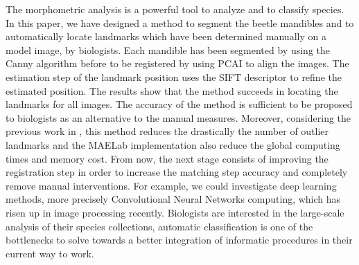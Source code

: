 \documentclass[twoside,twocolumn,10pt]{article}
\begin{document}
The morphometric analysis is a powerful tool to analyze and to
classify species. In this paper, we have designed a method to segment
the beetle mandibles and to automatically locate landmarks which have
been determined manually on a model image, by biologists. Each
mandible has been segmented by using the Canny algorithm before to be
registered by using PCAI to align the images. The estimation step of the
landmark position uses the SIFT descriptor to refine the estimated position.
The results show that the method succeeds in locating the landmarks for all images.
The accuracy of the method is sufficient to be proposed to biologists
as an alternative to the manual measures. Moreover, considering the previous work in
\cite{leestimating}, this method reduces the drastically the number of
outlier landmarks and the MAELab implementation also reduce the global
computing times and memory cost. From now, the next stage consists of
improving the registration step in order to increase the matching step
accuracy and completely remove manual interventions. For example, we
could investigate deep learning methods, more precisely Convolutional
Neural Networks computing,  which has risen up in
image processing recently. Biologists are interested in the large-scale
analysis of their species collections, automatic classification is one of the
bottlenecks to solve towards a better integration of informatic procedures in
their current way to work.






\end{document}
